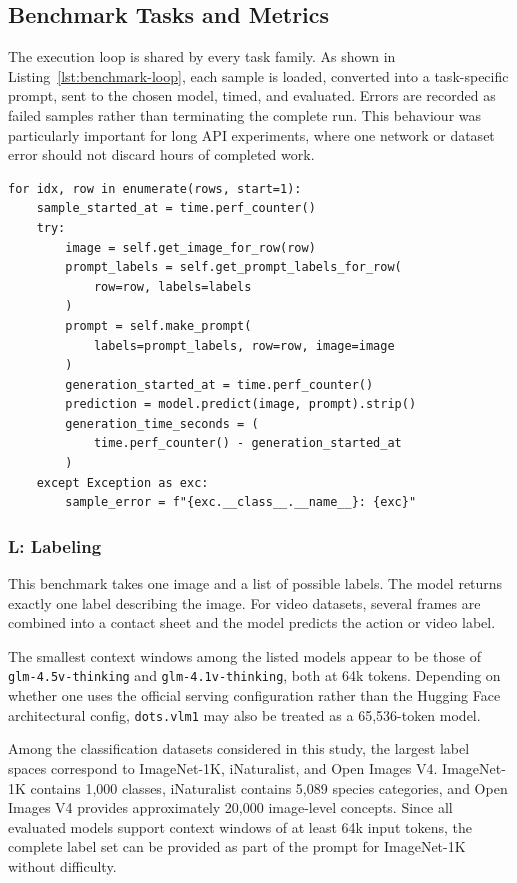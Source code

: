 ﻿\documentclass[11pt,a4paper]{article}
\begin{document}
\clearpage
\subsection{Benchmark Tasks and Metrics}
\label{sec:benchmark-tasks}

The execution loop is shared by every task family. As shown in
Listing~\ref{lst:benchmark-loop}, each sample is loaded, converted into a
task-specific prompt, sent to the chosen model, timed, and evaluated. Errors
are recorded as failed samples rather than terminating the complete run. This
behaviour was particularly important for long API experiments, where one
network or dataset error should not discard hours of completed work.

\begin{lstlisting}[caption={Core per-sample execution from
\texttt{benchmarks/\_base\_benchmark.py}.},label={lst:benchmark-loop}]
for idx, row in enumerate(rows, start=1):
    sample_started_at = time.perf_counter()
    try:
        image = self.get_image_for_row(row)
        prompt_labels = self.get_prompt_labels_for_row(
            row=row, labels=labels
        )
        prompt = self.make_prompt(
            labels=prompt_labels, row=row, image=image
        )
        generation_started_at = time.perf_counter()
        prediction = model.predict(image, prompt).strip()
        generation_time_seconds = (
            time.perf_counter() - generation_started_at
        )
    except Exception as exc:
        sample_error = f"{exc.__class__.__name__}: {exc}"
\end{lstlisting}
\subsubsection{\textbf{L}: Labeling}

This benchmark takes one image and a list of possible labels. The model returns exactly one label describing the image. For video datasets, several frames are combined into a contact sheet and the model predicts the action or video label.

The smallest context windows among the listed models appear to be those of
\texttt{glm-4.5v-thinking} and \texttt{glm-4.1v-thinking}, both at 64k tokens.
Depending on whether one uses the official serving configuration rather than
the Hugging Face architectural config, \texttt{dots.vlm1} may also be treated
as a 65,536-token model.

Among the classification datasets considered in this study, the largest label spaces correspond to ImageNet-1K, iNaturalist, and Open Images V4. ImageNet-1K contains 1,000 classes, iNaturalist contains 5,089 species categories, and Open Images V4 provides approximately 20,000 image-level concepts. Since all evaluated models support context windows of at least 64k input tokens, the complete label set can be provided as part of the prompt for ImageNet-1K without difficulty.
\end{document}

